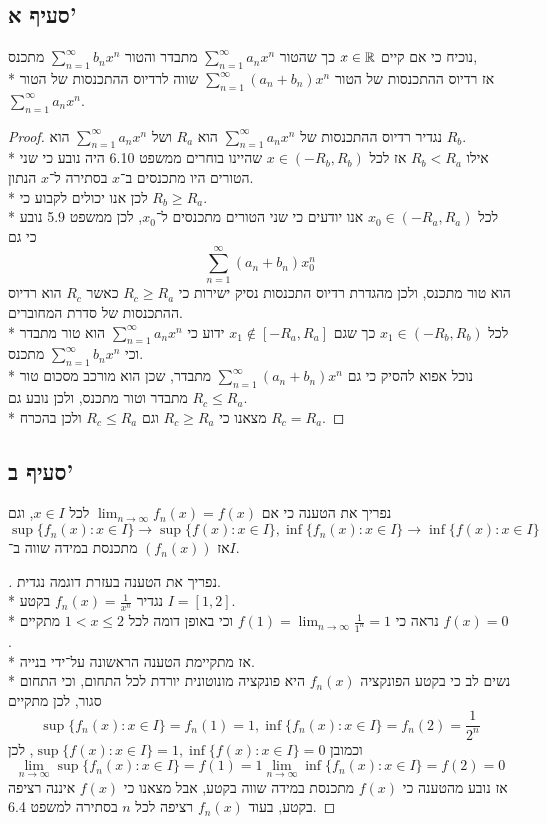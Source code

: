 \subsection{סעיף א'}
נוכיח כי אם קיים $x \in \mathbb{R}$ כך שהטור $\sum_{n = 1}^{\infty} a_n x^n$ מתבדר והטור $\sum_{n = 1}^{\infty} b_n x^n$ מתכנס, \\*
אז רדיוס ההתכנסות של הטור $\sum_{n = 1}^{\infty} (a_n + b_n) x^n$ שווה לרדיוס ההתכנסות של הטור $\sum_{n = 1}^{\infty} a_n x^n$.
\begin{proof}
	נגדיר רדיוס ההתכנסות של $\sum_{n = 1}^{\infty} a_n x^n$ הוא $R_a$ ושל $\sum_{n = 1}^{\infty} a_n x^n$ הוא $R_b$. \\*
	אילו $R_b < R_a$ אז לכל $x \in (-R_b, R_b)$ שהיינו בוחרים ממשפט 6.10 היה נובע כי שני הטורים היו מתכנסים ב־$x$ בסתירה ל־$x$ הנתון. \\*
	לכן אנו יכולים לקבוע כי $R_b \ge R_a$. \\*
	לכל $x_0 \in (-R_a, R_a)$ אנו יודעים כי שני הטורים מתכנסים ל־$x_0$, לכן ממשפט 5.9 נובע כי גם
	\[
		\sum_{n = 1}^{\infty} (a_n + b_n) x_0^n
	\]
	הוא טור מתכנס, ולכן מהגדרת רדיוס התכנסות נסיק ישירות כי $R_c \ge R_a$ כאשר $R_c$ הוא רדיוס ההתכנסות של סדרת המחוברים. \\*
	לכל $x_1 \in (-R_b, R_b)$ כך שגם $x_1 \notin [-R_a, R_a]$ ידוע כי $\sum_{n = 1}^{\infty} a_n x^n$ הוא טור מתבדר וכי $\sum_{n = 1}^{\infty} b_n x^n$ מתכנס. \\*
	נוכל אפוא להסיק כי גם $\sum_{n = 1}^{\infty} (a_n + b_n) x^n$ מתבדר, שכן הוא מורכב מסכום טור מתבדר וטור מתכנס, ולכן נובע גם $R_c \le R_a$. \\*
	מצאנו כי $R_c \ge R_a$ וגם $R_c \le R_a$ ולכן בהכרח $R_c = R_a$.
\end{proof}

\subsection{סעיף ב'}
נפריך את הטענה כי אם $\lim_{n \to \infty} f_n(x) = f(x)$ לכל $x \in I$, וגם
\[
	\sup\{f_n(x) : x \in I\} \rightarrow \sup\{ f(x) : x \in I\},
	\inf\{f_n(x) : x \in I\} \rightarrow \inf\{ f(x) : x \in I\}
\]
אז $(f_n(x))$ מתכנסת במידה שווה ב־$I$.
\begin{proof}[]
	נפריך את הטענה בעזרת דוגמה נגדית. \\*
	נגדיר $f_n(x) = \frac{1}{x^n}$ בקטע $I = [1, 2]$. \\*
	נראה כי $f(1) = \lim_{n \to \infty} \frac{1}{1^n} = 1$ וכי באופן דומה לכל $1 < x \le 2$ מתקיים $f(x) = 0$. \\*
	אז מתקיימת הטענה הראשונה על־ידי בנייה. \\*
	נשים לב כי בקטע הפונקציה $f_n(x)$ היא פונקציה מונוטונית יורדת לכל התחום, וכי התחום סגור, לכן מתקיים
	\[
		\sup\{ f_n(x) : x \in I \} = f_n(1) = 1,
		\inf\{ f_n(x) : x \in I \} = f_n(2) = \frac{1}{2^n}
	\]
	וכמובן $\sup\{ f(x) : x \in I\} = 1, \inf\{ f(x) : x \in I\} = 0$, לכן
	\[
		\lim_{n \to \infty} \sup\{ f_n(x) : x \in I \} = f(1) = 1
		\lim_{n \to \infty} \inf\{ f_n(x) : x \in I \} = f(2) = 0
	\]
	אז נובע מהטענה כי $f(x)$ מתכנסת במידה שווה בקטע, אבל מצאנו כי $f(x)$ איננה רציפה בקטע, בעוד $f_n(x)$ רציפה לכל $n$ בסתירה למשפט 6.4.
\end{proof}


